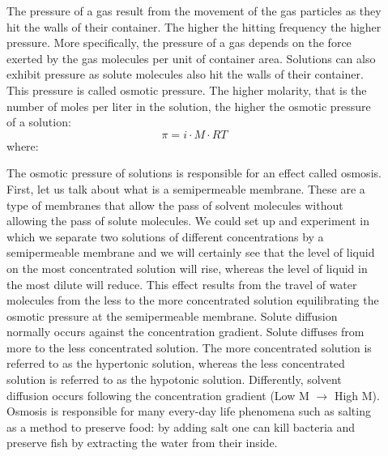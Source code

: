 \documentclass[main.tex]{subfiles}
\newcommand\chapterlabel{physicalsolutions}
\begin{document}
\begin{description}
\item[] 
The pressure of a gas result from the movement of the gas particles as they hit the walls of their container. The higher the hitting frequency the higher pressure. More specifically, the pressure of a gas depends on the force exerted by the gas molecules per unit of container area. Solutions can also exhibit pressure as solute molecules also hit the walls of their container. This pressure is called osmotic pressure. The higher molarity, that is the number of moles per liter in the solution, the higher the osmotic pressure of a solution:
\begin{equation}
\boxed{ \pi=i\cdot M\cdot RT 	}
\label{\chapterlabel:equation13}
\end{equation}
where:
The osmotic pressure of solutions is responsible for an effect called osmosis. First, let us talk about what is a semipermeable membrane. These are a type of membranes that allow the pass of solvent molecules without allowing the pass of solute molecules. 
We could set up and experiment in which we separate two solutions of different concentrations by a semipermeable membrane and we will certainly see that the level of liquid on the most concentrated solution will rise, whereas the level of liquid in the most dilute will reduce. 
This effect results from the travel of water molecules from the less to the more concentrated solution equilibrating the osmotic pressure at the semipermeable membrane. 
Solute diffusion normally occurs against the concentration gradient. Solute diffuses from more to the less concentrated solution. The more concentrated solution is referred to as the hypertonic solution, whereas the less concentrated solution is referred to as the hypotonic solution.
Differently, solvent diffusion occurs following the concentration gradient (Low M $\rightarrow$ High M). Osmosis is responsible for many every-day life phenomena such as salting as a method to preserve food: by adding salt one can kill bacteria and preserve fish by extracting the water from their inside.  




\end{description}
\end{document}
